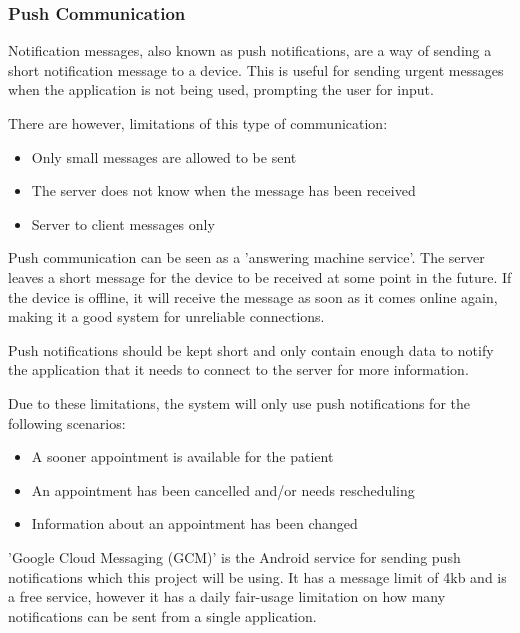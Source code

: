 \subsubsection{Push Communication}

Notification messages, also known as push notifications, are a way of sending a short notification message to a device. This is useful for sending urgent messages when the application is not being used, prompting the user for input.

There are however, limitations of this type of communication:

\begin{itemize}
	\item Only small messages are allowed to be sent
	\item The server does not know when the message has been received
	\item Server to client messages only
\end{itemize}

Push communication can be seen as a 'answering machine service'. The server leaves a short message for the device to be received at some point in the future. If the device is offline, it will receive the message as soon as it comes online again, making it a good system for unreliable connections.

Push notifications should be kept short and only contain enough data to notify the application that it needs to connect to the server for more information.

Due to these limitations, the system will only use push notifications for the following scenarios:

\begin{itemize}
	\item A sooner appointment is available for the patient
	\item An appointment has been cancelled and/or needs rescheduling
	\item Information about an appointment has been changed
\end{itemize}

'Google Cloud Messaging (GCM)' is the Android service for sending push notifications which this project will be using. It has a message limit of 4kb and is a free service, however it has a daily fair-usage limitation on how many notifications can be sent from a single application.

